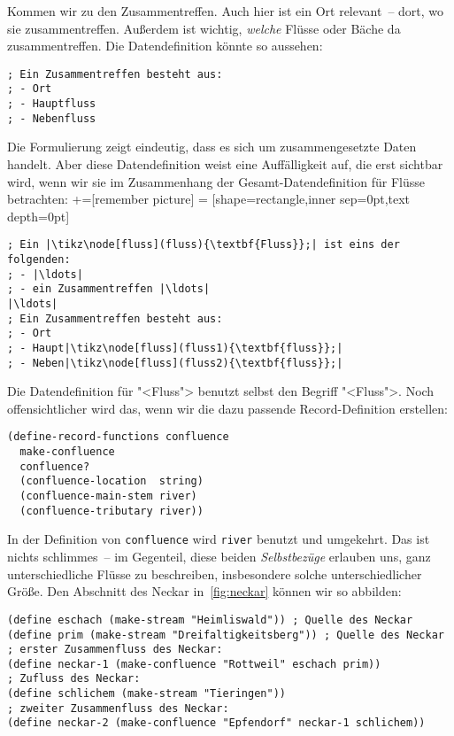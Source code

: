 Kommen wir zu den Zusammentreffen.  Auch hier ist ein Ort relevant~--
dort, wo sie zusammentreffen.  Außerdem ist wichtig, \emph{welche}
Flüsse oder Bäche da zusammentreffen.  Die Datendefinition könnte so
aussehen:
%
\begin{lstlisting}
; Ein Zusammentreffen besteht aus:
; - Ort
; - Hauptfluss
; - Nebenfluss
\end{lstlisting}
%
Die Formulierung zeigt eindeutig, dass es sich um zusammengesetzte
Daten handelt.  Aber diese Datendefinition weist eine Auffälligkeit
auf, die erst sichtbar wird, wenn wir sie im Zusammenhang der
Gesamt-Datendefinition für Flüsse betrachten:
%
+=[remember picture]
 = [shape=rectangle,inner sep=0pt,text depth=0pt]
%
\begin{lstlisting}
; Ein |\tikz\node[fluss](fluss){\textbf{Fluss}};| ist eins der folgenden:
; - |\ldots|
; - ein Zusammentreffen |\ldots|
|\ldots|
; Ein Zusammentreffen besteht aus:
; - Ort
; - Haupt|\tikz\node[fluss](fluss1){\textbf{fluss}};|
; - Neben|\tikz\node[fluss](fluss2){\textbf{fluss}};|
\end{lstlisting}
%
%
Die Datendefinition für "<Fluss"> benutzt selbst den Begriff
"<Fluss">.   Noch offensichtlicher wird das, wenn wir die dazu
passende Record-Definition erstellen:
%
\begin{lstlisting}
(define-record-functions confluence
  make-confluence
  confluence?
  (confluence-location  string)
  (confluence-main-stem river)
  (confluence-tributary river))
\end{lstlisting}
%
In der Definition von \texttt{confluence} wird \texttt{river} benutzt
und umgekehrt.  Das ist nichts schlimmes~-- im Gegenteil, diese beiden
\textit{Selbstbezüge} erlauben uns, ganz
unterschiedliche Flüsse zu beschreiben, insbesondere solche
unterschiedlicher Größe.  Den Abschnitt des Neckar in~\ref{fig:neckar}
können wir so abbilden:
%
\begin{lstlisting}
(define eschach (make-stream "Heimliswald")) ; Quelle des Neckar
(define prim (make-stream "Dreifaltigkeitsberg")) ; Quelle des Neckar
; erster Zusammenfluss des Neckar:
(define neckar-1 (make-confluence "Rottweil" eschach prim))
; Zufluss des Neckar:
(define schlichem (make-stream "Tieringen")) 
; zweiter Zusammenfluss des Neckar:
(define neckar-2 (make-confluence "Epfendorf" neckar-1 schlichem))
\end{lstlisting}
